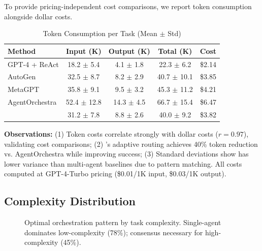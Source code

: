 \documentclass{article}
\theoremstyle{plain}
\theoremstyle{definition}
\theoremstyle{remark}
\begin{document}
To provide pricing-independent cost comparisons, we report token consumption alongside dollar costs.

\begin{table}[h]
	\caption{Token Consumption per Task (Mean $\pm$ Std)}
	\label{tab:token_costs}
	\centering
	\small
	\begin{tabular}{@{}lcccc@{}}
		\toprule
		\textbf{Method} & \textbf{Input (K)} & \textbf{Output (K)} & \textbf{Total (K)} & \textbf{Cost} \\
		\midrule
		GPT-4 + ReAct & 18.2 $\pm$ 5.4 & 4.1 $\pm$ 1.8 & 22.3 $\pm$ 6.2 & \$2.14 \\
		AutoGen & 32.5 $\pm$ 8.7 & 8.2 $\pm$ 2.9 & 40.7 $\pm$ 10.1 & \$3.85 \\
		MetaGPT & 35.8 $\pm$ 9.1 & 9.5 $\pm$ 3.2 & 45.3 $\pm$ 11.2 & \$4.21 \\
		AgentOrchestra & 52.4 $\pm$ 12.8 & 14.3 $\pm$ 4.5 & 66.7 $\pm$ 15.4 & \$6.47 \\
		\textbf{\amore{}} & 31.2 $\pm$ 7.8 & 8.8 $\pm$ 2.6 & 40.0 $\pm$ 9.2 & \$3.82 \\
		\bottomrule
	\end{tabular}
\end{table}

\textbf{Observations:} (1) Token costs correlate strongly with dollar costs ($r=0.97$), validating cost comparisons; (2) \amore{}'s adaptive routing achieves 40\% token reduction vs. AgentOrchestra while improving success; (3) Standard deviations show \amore{} has lower variance than multi-agent baselines due to pattern matching. All costs computed at GPT-4-Turbo pricing (\$0.01/1K input, \$0.03/1K output).

\subsection{Complexity Distribution}
\begin{figure}[h]
	\centering
	\scalebox{0.6}{}
	\caption{Optimal orchestration pattern by task complexity. Single-agent dominates low-complexity (78\%); consensus necessary for high-complexity (45\%).}
	\label{fig:framework4}
\end{figure}
\end{document}
